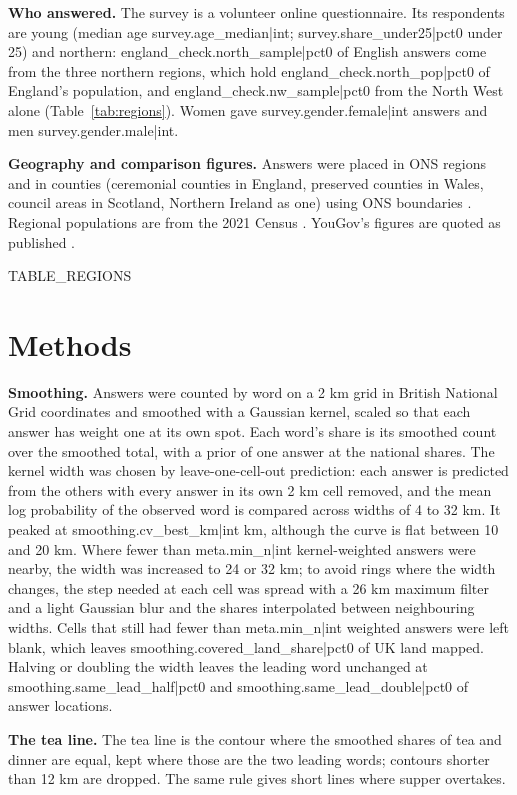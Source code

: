 \documentclass[11pt,a4paper]{article}
\begin{document}
\textbf{Who answered.} The survey is a volunteer online questionnaire. Its respondents are young (median age {{survey.age_median|int}}; {{survey.share_under25|pct0}} under 25) and northern: {{england_check.north_sample|pct0}} of English answers come from the three northern regions, which hold {{england_check.north_pop|pct0}} of England's population, and {{england_check.nw_sample|pct0}} from the North West alone (Table~\ref{tab:regions}). Women gave {{survey.gender.female|int}} answers and men {{survey.gender.male|int}}.

\textbf{Geography and comparison figures.} Answers were placed in ONS regions and in counties (ceremonial counties in England, preserved counties in Wales, council areas in Scotland, Northern Ireland as one) using ONS boundaries \citep{ons_geo}. Regional populations are from the 2021 Census \citep{census}. YouGov's figures are quoted as published \citep{yougov}.

{{TABLE_REGIONS}}

\section{Methods}
\textbf{Smoothing.} Answers were counted by word on a 2 km grid in British National Grid coordinates and smoothed with a Gaussian kernel, scaled so that each answer has weight one at its own spot. Each word's share is its smoothed count over the smoothed total, with a prior of one answer at the national shares. The kernel width was chosen by leave-one-cell-out prediction: each answer is predicted from the others with every answer in its own 2 km cell removed, and the mean log probability of the observed word is compared across widths of 4 to 32 km. It peaked at {{smoothing.cv_best_km|int}} km, although the curve is flat between 10 and 20 km. Where fewer than {{meta.min_n|int}} kernel-weighted answers were nearby, the width was increased to 24 or 32 km; to avoid rings where the width changes, the step needed at each cell was spread with a 26 km maximum filter and a light Gaussian blur and the shares interpolated between neighbouring widths. Cells that still had fewer than {{meta.min_n|int}} weighted answers were left blank, which leaves {{smoothing.covered_land_share|pct0}} of UK land mapped. Halving or doubling the width leaves the leading word unchanged at {{smoothing.same_lead_half|pct0}} and {{smoothing.same_lead_double|pct0}} of answer locations.

\textbf{The tea line.} The tea line is the contour where the smoothed shares of tea and dinner are equal, kept where those are the two leading words; contours shorter than 12 km are dropped. The same rule gives short lines where supper overtakes.
\end{document}
